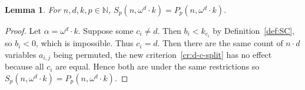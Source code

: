 \documentclass[11pt]{article}
\newcommand{\om}{\omega}
\newcommand{\N}{\mathbb{N}}
\newcommand{\numpoints}{n}
\newcommand{\inumpoints}{i}
\newcommand{\idegr}{j}
\newcommand{\commonconst}{a}
\newcommand{\rareconst}{b}
\theoremstyle{plain}
\newtheorem{lemma}[theorem]{Lemma}
\theoremstyle{definition}
\begin{document}
\begin{lemma}
\label{le:D-is-P}
For $\numpoints,d,k,p \in \N$, $S_p(\numpoints, \om^d \cdot k) = P_p(\numpoints, \om^d \cdot k)$.
\end{lemma}
\begin{proof}
Let $\alpha = \om^d \cdot k$. Suppose some $c_{\inumpoints} \neq d$. Then $\rareconst_{\inumpoints} < k_{c_{\inumpoints}}$ by Definition~\ref{def:SC}, so $\rareconst_{\inumpoints} < 0$, which is impossible. Thus $c_{\inumpoints} = d$. Then there are the same count of $\numpoints \cdot d$ variables  $\commonconst_{\inumpoints,\idegr}$ being permuted, the new criterion~\ref{cr:d-c-split} has no effect because all $c_{\inumpoints}$ are equal. Hence both are under the same restrictions so $S_p(\numpoints, \om^d \cdot k) = P_p(\numpoints, \om^d \cdot k)$.
\end{proof}
\end{document}
